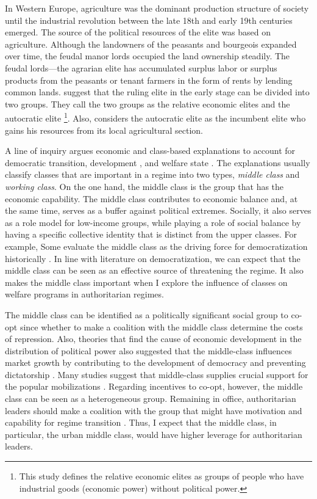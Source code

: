 \documentclass[11pt, notitlepage]{article}
\begin{document}
In Western Europe, agriculture was the dominant production structure of society until the industrial revolution between the late 18th and early 19th centuries emerged. The source of the political resources of the elite was based on agriculture. Although the landowners of the peasants and bourgeois expanded over time, the feudal manor lords occupied the land ownership steadily. The feudal lords---the agrarian elite has accumulated surplus labor or surplus products from the peasants or tenant farmers in the form of rents by lending common lands. \citet{Ansell2015a} suggest that the ruling elite in the early stage can be divided into two groups. They call the two groups as the relative economic elites and the autocratic elite \footnote{This study defines the relative economic elites as groups of people who have industrial goods (economic power) without political power.}. Also, \citet{Ansell2015a} considers the autocratic elite as the incumbent elite who gains his resources from its local agricultural section.

A line of inquiry argues economic and class-based explanations to account for democratic transition, development \citep[4-5]{ziblatt2017conservative}, and welfare state \citep{Huber1993,HuberStephens2001,Korpi2006}. The explanations usually classify classes that are important in a regime into two types, \textit{middle class} and \textit{working class}. On the one hand, the middle class is the group that has the economic capability. The middle class contributes to economic balance and, at the same time, serves as a buffer against political extremes. Socially, it also serves as a role model for low-income groups, while playing a role of social balance by having a specific collective identity that is distinct from the upper classes. For example, Some evaluate the middle class as the driving force for democratization historically \citep{Moore1993Social}. In line with literature on democratization, we can expect that the middle class can be seen as an effective source of threatening the regime. It also makes the middle class important when I explore the influence of classes on welfare programs in authoritarian regimes.

The middle class can be identified as a politically significant social group to co-opt since whether to make a coalition with the middle class determine the costs of repression. Also, theories that find the cause of economic development in the distribution of political power also suggested that the middle-class influences market growth by contributing to the development of democracy and preventing dictatorship \citep{Easterly2001}. Many studies suggest that middle-class supplies crucial support for the popular mobilizations \citep{Rosenfeld2017, Dahlum2019}. Regarding incentives to co-opt, however, the middle class can be seen as a heterogeneous group. Remaining in office, authoritarian leaders should make a coalition with the group that might have motivation and capability for regime transition \citep{Dahlum2019}. Thus, I expect that the middle class, in particular, the urban middle class, would have higher leverage for authoritarian leaders.
\end{document}
